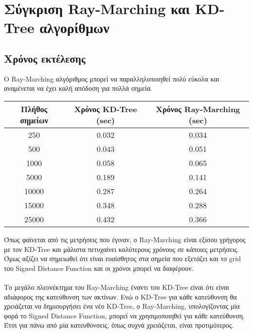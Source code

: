 \documentclass{report}
\begin{document}
\section{Σύγκριση Ray-Marching και KD-Tree αλγορίθμων}
\subsection{Χρόνος εκτέλεσης}
Ο Ray-Marching αλγόριθμος μπορεί να παραλληλοποιηθεί πολύ εύκολα και αναμένεται να έχει καλή απόδοση για πολλά σημεία.

\begin{table}[H]
    \centering
    \begin{tabular}{c||c c}
        Πλήθος σημείων & Χρόνος KD-Tree (sec) & Xρόνος Ray-Marching (sec) \\
        \hline
        250 & 0.032 & 0.034\\
        500 & 0.043 & 0.051\\
        1000 & 0.058 & 0.065\\
        5000 & 0.189 & 0.141\\
        10000 & 0.287 & 0.264\\
        15000 & 0.348 & 0.288\\
        25000 & 0.432 & 0.366\\
    \end{tabular} 
\end{table}
Όπως φαίνεται από τις μετρήσεις που έγιναν, ο Ray-Marching είναι εξίσου γρήγορος με τον KD-Tree και μάλιστα
πετυχαίνει καλύτερους χρόνους σε κάποιες μετρήσεις. Όμως αξίζει να σημειωθεί ότι είναι ευαίσθητος στα σημεία που εξετάζει
και το grid του Signed Distance Function και οι χρόνοι μπορεί να διαφέρουν.
\\\\
Το μεγάλο πλεονέκτημα του Ray-Marching έναντι του KD-Tree είναι ότι είναι αδιάφορος της κατεύθυνση των ακτίνων. Ενώ ο
KD-Tree για κάθε κατεύθυνση θα χρειάζεται να δημιουργήσει ένα νέο KD-Tree, ο Ray-Marching, υπολογίζοντας μία φορά το
Signed Distance Function, μπορεί να χρησιμοποιηθεί για κάθε κατεύθυνση. Έτσι για πάνω από μία κατευθύνσεις, όπως συχνά χρειάζεται,
είναι προτιμότερος.
\end{document}
